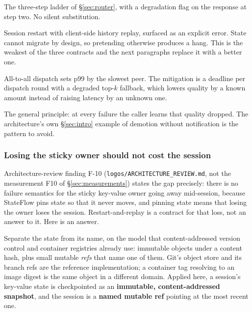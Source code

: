 \documentclass[11pt]{article}
\begin{document}
\begin{description}[itemsep=2pt,leftmargin=1.4em]
\item[Tower unreachable.] The three-step ladder of \S\ref{sec:router}, with a degradation flag on the response at step two. No silent substitution.
\item[Sticky owner lost.] Session restart with client-side history replay, surfaced as an explicit error. State cannot migrate by design, so pretending otherwise produces a hang. This is the weakest of the three contracts and the next paragraphs replace it with a better one.
\item[Straggler in expert dispatch.] All-to-all dispatch sets p99 by the slowest peer. The mitigation is a deadline per dispatch round with a degraded top-$k$ fallback, which lowers quality by a known amount instead of raising latency by an unknown one.
\end{description}

The general principle: at every failure the caller learns that quality dropped. The architecture's own \S\ref{sec:intro} example of demotion without notification is the pattern to avoid.

\subsubsection*{Losing the sticky owner should not cost the session}

Architecture-review finding F-10 (\texttt{logos/ARCHITECTURE\_REVIEW.md}, not the measurement F10 of \S\ref{sec:measurements}) states the gap precisely: there is no failure semantics for the sticky key-value owner going away mid-session, because StateFlow pins state so that it never moves, and pinning state means that losing the owner loses the session. Restart-and-replay is a contract for that loss, not an answer to it. Here is an answer.

Separate the state from its name, on the model that content-addressed version control and container registries already use: immutable objects under a content hash, plus small mutable \emph{refs} that name one of them. Git's object store and its branch refs are the reference implementation; a container tag resolving to an image digest is the same object in a different domain. Applied here, a session's key-value state is checkpointed as an \textbf{immutable, content-addressed snapshot}, and the session is a \textbf{named mutable ref} pointing at the most recent one.
\end{document}
